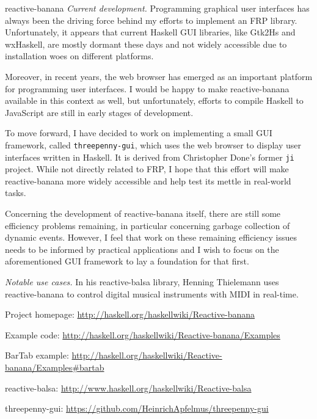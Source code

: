 \begin{hcarentry}[updated]{reactive-banana}
\emph{Current development.}
Programming graphical user interfaces has always been the driving force behind my efforts to implement an FRP library. Unfortunately, it appears that current Haskell GUI libraries, like Gtk2Hs and wxHaskell, are mostly dormant these days and not widely accessible due to installation woes on different platforms.

Moreover, in recent years, the web browser has emerged as an important platform for programming user interfaces. I would be happy to make reactive-banana available in this context as well, but unfortunately, efforts to compile Haskell to JavaScript are still in early stages of development.

To move forward, I have decided to work on implementing a small GUI framework, called \verb!threepenny-gui!, which uses the web browser to display user interfaces written in Haskell. It is derived from Christopher Done's former \verb!ji! project. While not directly related to FRP, I hope that this effort will make reactive-banana more widely accessible and help test its mettle in real-world tasks.

Concerning the development of reactive-banana itself, there are still some efficiency problems remaining, in particular concerning garbage collection of dynamic events. However, I feel that work on these remaining efficiency issues needs to be informed by practical applications and I wish to focus on the aforementioned GUI framework to lay a foundation for that first.

\emph{Notable use cases.} In his reactive-balsa library, Henning Thielemann uses reactive-banana to control digital musical instruments with MIDI in real-time.

\FurtherReading
\begin{compactitem}
\item Project homepage: \url{http://haskell.org/haskellwiki/Reactive-banana}
\item Example code: \url{http://haskell.org/haskellwiki/Reactive-banana/Examples}
\item BarTab example: \url{http://haskell.org/haskellwiki/Reactive-banana/Examples#bartab}
\item reactive-balsa: \url{http://www.haskell.org/haskellwiki/Reactive-balsa}
\item threepenny-gui: \url{https://github.com/HeinrichApfelmus/threepenny-gui}
\end{compactitem}
\end{hcarentry}
